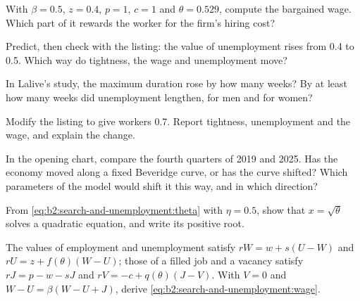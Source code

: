 \begin{exercise}[$\star\star$]\label{exo:b2:search-and-unemployment:5}
With $\beta = 0.5$, $z = 0.4$, $p = 1$, $c = 1$ and $\theta = 0.529$, compute the bargained wage. Which part of it rewards the worker for the firm's hiring cost?
\end{exercise}

\begin{exercise}[$\star\star$]\label{exo:b2:search-and-unemployment:6}
Predict, then check with the listing: the value of unemployment rises from 0.4 to 0.5. Which way do tightness, the wage and unemployment
move?
\end{exercise}

\begin{exercise}[$\star\star$]\label{exo:b2:search-and-unemployment:7}
In Lalive's study, the maximum duration rose by how many weeks? By at least how many weeks did unemployment lengthen, for men
and for women?
\end{exercise}

\begin{exercise}[$\star\star$]\label{exo:b2:search-and-unemployment:8}
Modify the listing to give workers  0.7. Report tightness, unemployment and the wage, and explain the change.
\end{exercise}

\begin{exercise}[$\star\star$]\label{exo:b2:search-and-unemployment:9}
In the opening chart, compare the fourth quarters of 2019 and 2025. Has the economy moved along a fixed Beveridge curve, or
has the curve shifted? Which parameters of the model would shift it this way, and in which direction?
\end{exercise}

\begin{exercise}[$\star\star\star$]\label{exo:b2:search-and-unemployment:10}
From \eqref{eq:b2:search-and-unemployment:theta} with $\eta = 0.5$, show that $x = \sqrt\theta$ solves a quadratic equation, and write its positive root.
\end{exercise}

\begin{exercise}[$\star\star\star$]\label{exo:b2:search-and-unemployment:11}
The values of employment and unemployment satisfy $rW = w + s(U - W)$ and $rU = z + f(\theta)(W - U)$; those of a filled job and a vacancy satisfy $rJ = p - w - sJ$ and $rV = -c + q(\theta)(J - V)$. With $V = 0$ and
$W - U = \beta(W - U + J)$, derive \eqref{eq:b2:search-and-unemployment:wage}.
\end{exercise}

